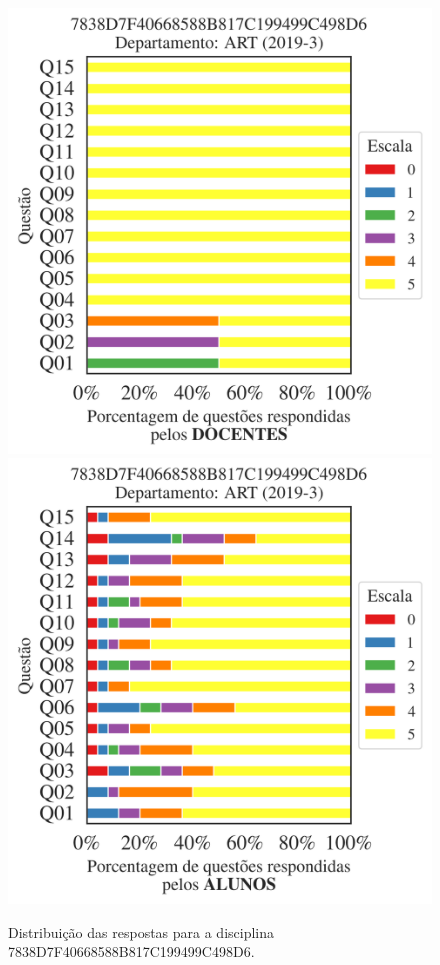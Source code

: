 \documentclass[a4paper,10pt]{article}
\begin{document}
\begin{figure}[h]
\centering
\includegraphics[width=0.485\linewidth]{analise_disciplina_departamento_ART_7838D7F40668588B817C199499C498D6_docentes.png}
\includegraphics[width=0.485\linewidth]{analise_disciplina_departamento_ART_7838D7F40668588B817C199499C498D6_alunos.png}
\caption{\label{fig:analise_geral_departamento}                Distribuição das respostas para a disciplina 7838D7F40668588B817C199499C498D6. }
\end{figure}
\end{document}

